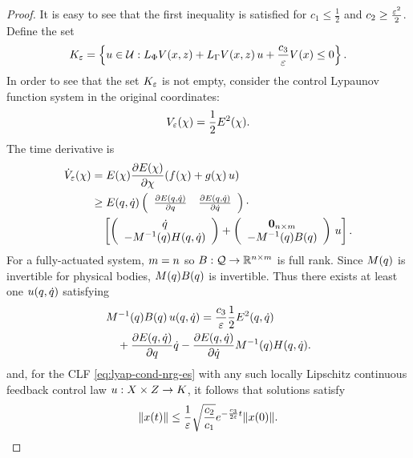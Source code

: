 \documentclass[twocolumn]{article}
\begin{document}
\begin{proof}
  It is easy to see that the first inequality is satisfied for $c_{1} \leq \frac{1}{2}$ and $c_{2} \geq \frac{\varepsilon^{2}}{2}$.
  Define the set
  \begin{align}
    K_{\varepsilon} = \left\{ u \in \mathcal{U} : L_{\Phi} V(x, z) + L_{\Gamma} V(x, z) \, u + \frac{c_{3}}{\varepsilon} V(x) \leq 0 \right\}.
    \label{eq:control-set}
  \end{align}
  In order to see that the set $K_{\varepsilon}$ is not empty, consider the control Lypaunov function system in the original coordinates:
  \begin{align}
    V_{\varepsilon}(\chi) = \frac{1}{2} E^{2}(\chi).
  \end{align}
  The time derivative is
  \begin{align}
    {\dot V}_{\varepsilon}(\chi) &= E(\chi) \frac{\partial{E(\chi)}}{\partial{\chi}}(f(\chi) + g(\chi) \, u)\\
    \nonumber
    &\geq E(q, \dot{q}) \left(\begin{array}{c c}
      \frac{\partial{E(q, \dot{q})}}{\partial{q}} & \frac{\partial{E(q, \dot{q})}}{\partial{\dot{q}}}
    \end{array}\right) \cdot\\
    \nonumber
    & \hspace{1em} \left[
      \left(\begin{array}{c}
        \dot{q}\\
        -M^{-1}(q) H(q, \dot{q})
      \end{array}\right) +
      \left(\begin{array}{c}
        {\mathbf 0}_{n \times m}\\
        -M^{-1}(q) B(q)
      \end{array}\right) \, u
      \right].
  \end{align}
  For a fully-actuated system, $m = n$ so $B : \mathcal{Q} \to \mathbb{R}^{n \times m}$ is full rank.
  Since $M(q)$ is invertible for physical bodies, $M(q) B(q)$ is invertible.
  Thus there exists at least one $u(q, \dot{q})$ satisfying
  \begin{align}
    \lefteqn{\M^{-1}(\q) \B(\q) \, \u(\q, \dq) = \frac{c_{3}}{\resclfparam} \frac{1}{2} \E^{2}(\q, \dq)}\\
    \nonumber
    && \mbox{} + \pd{\E(\q, \dq)}{\q} \dq - \pd{\E(\q, \dq)}{\dq} \M^{-1}(\q) \CG(\q, \dq).
  \end{align}
  and, for the CLF \eqref{eq:lyap-cond-nrg-es} with any such locally Lipschitz continuous feedback control law $u : X \times Z \to K$, it follows that solutions satisfy
  \begin{align}
    \label{eq:xt-bounds}
    \| x(t) \| \leq \frac{1}{\varepsilon} \sqrt{\frac{c_{2}}{c_{1}}} e^{-\frac{c_{3}}{2\varepsilon} t} \| x(0) \|.
  \end{align}
\end{proof}
\end{document}
